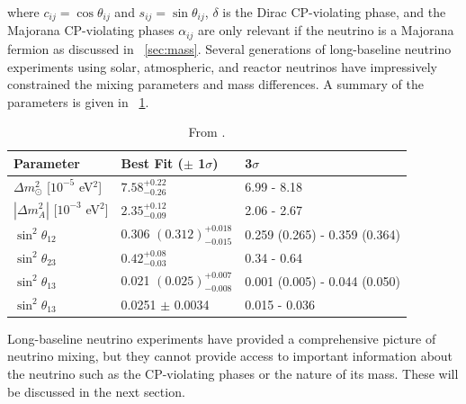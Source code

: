 where $c_{ij} = \cos{\theta_{ij}}$ and $s_{ij} = \sin{\theta_{ij}}$, $\delta$ is the Dirac CP-violating phase, and the Majorana CP-violating phases $\alpha_{ij}$ are only relevant if the neutrino is a Majorana fermion as discussed in {\sect}~\ref{sec:mass}.  Several generations of long-baseline neutrino experiments using solar, atmospheric, and reactor neutrinos have impressively constrained the mixing parameters and mass differences.  A summary of the parameters is given in {\tab}~\ref{tab:neutrinoParameters}.
\begin{table}
\centering
\begin{tabular}{lll}\toprule
Parameter & Best Fit ($\pm$ 1$\sigma$) & 3$\sigma$ \\
\midrule
${\Delta}m^2_{\odot}$ [$10^{-5}$ eV$^2$] & $7.58^{+0.22}_{-0.26}$ & 6.99 - 8.18 \\
$|{\Delta}m^2_A|$ [$10^{-3}$ eV$^2$] & $2.35^{+0.12}_{-0.09}$ & 2.06 - 2.67 \\
$\sin^2{\theta_{12}}$ & 0.306 $(0.312)^{+0.018}_{-0.015}$ & 0.259 (0.265) - 0.359 (0.364) \\  
$\sin^2{\theta_{23}}$ & $0.42^{+0.08}_{-0.03}$ & 0.34 - 0.64 \\  
$\sin^2{\theta_{13}}$ & 0.021 $(0.025)^{+0.007}_{-0.008}$ & 0.001 (0.005) - 0.044 (0.050) \\   
$\sin^2{\theta_{13}}$ & 0.0251 $\pm$ 0.0034 & 0.015 - 0.036 \\
\bottomrule  
\end{tabular}
\caption{From \cite{PDG}.}
\label{tab:neutrinoParameters}
\end{table}
Long-baseline neutrino experiments have provided a comprehensive picture of neutrino mixing, but they cannot provide access to important information about the neutrino such as the CP-violating phases or the nature of its mass.  These will be discussed in the next section.


